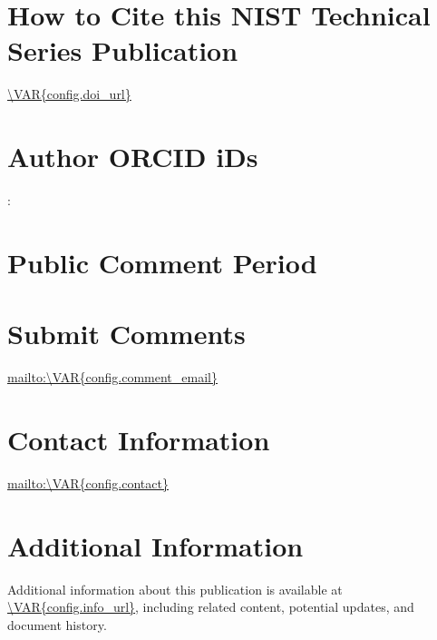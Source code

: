 \section*{How to Cite this NIST Technical Series Publication}

\par %
 \url{\VAR{config.doi_url}}
\par %

\section*{Author ORCID iDs}

: {}\\



\section*{Public Comment Period} %


\section*{Submit Comments}

\url{mailto:\VAR{config.comment_email}}


\section*{Contact Information}

\url{mailto:\VAR{config.contact}}


\section*{Additional Information}

Additional information about this publication is available at \url{\VAR{config.info_url}},
including related content, potential updates, and document history.

\normalsize{\bfseries{}}

	\tagstructend %

\hypersetup{bookmarksdepth=4}
